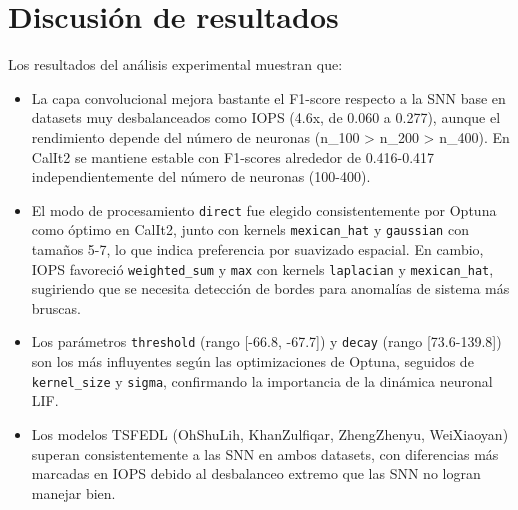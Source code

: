 \section{Discusión de resultados}
Los resultados del análisis experimental muestran que:
\begin{itemize}
    \item La capa convolucional mejora bastante el F1-score respecto a la SNN base en datasets muy desbalanceados como IOPS (4.6x, de 0.060 a 0.277), aunque el rendimiento depende del número de neuronas (n\_100 > n\_200 > n\_400). En CalIt2 se mantiene estable con F1-scores alrededor de 0.416-0.417 independientemente del número de neuronas (100-400).
    \item El modo de procesamiento \texttt{direct} fue elegido consistentemente por Optuna como óptimo en CalIt2, junto con kernels \texttt{mexican\_hat} y \texttt{gaussian} con tamaños 5-7, lo que indica preferencia por suavizado espacial. En cambio, IOPS favoreció \texttt{weighted\_sum} y \texttt{max} con kernels \texttt{laplacian} y \texttt{mexican\_hat}, sugiriendo que se necesita detección de bordes para anomalías de sistema más bruscas.
    \item Los parámetros \texttt{threshold} (rango [-66.8, -67.7]) y \texttt{decay} (rango [73.6-139.8]) son los más influyentes según las optimizaciones de Optuna, seguidos de \texttt{kernel\_size} y \texttt{sigma}, confirmando la importancia de la dinámica neuronal LIF.
    \item Los modelos TSFEDL (OhShuLih, KhanZulfiqar, ZhengZhenyu, WeiXiaoyan) superan consistentemente a las SNN en ambos datasets, con diferencias más marcadas en IOPS debido al desbalanceo extremo que las SNN no logran manejar bien.
\end{itemize}


